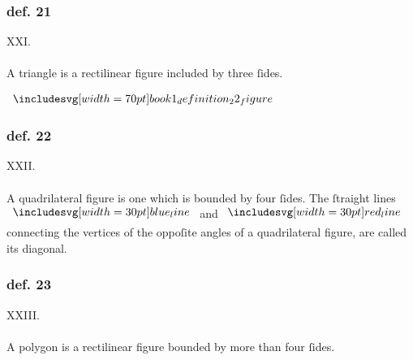 \hfill

\begin{minipage}{0.67\textwidth}
    \subsubsection{def. 21}
    \begin{center}
        XXI.\label{book1def21}\\
        \hfill\\
        A triangle is a rectilinear figure included by three ſides.\\
    \end{center}
\end{minipage}%
\begin{minipage}{0.33\textwidth}
    \phantom{}
\end{minipage}

\hfill

\begin{minipage}{0.33\textwidth}
    \begin{center}
        $\img[0][0][70]{book1_definition_22_figure}$
    \end{center}
\end{minipage}%
\begin{minipage}{0.67\textwidth}
    \subsubsection{def. 22}
    \begin{center}
        XXII.\label{book1def22}\\
        \hfill\\
        A quadrilateral figure is one which is bounded by four ſides. The ſtraight lines $\blueline$ and $\redline$ connecting the vertices of the oppoſite angles of a quadrilateral figure, are called its diagonal.
    \end{center}
\end{minipage}

\hfill

\begin{minipage}{0.33\textwidth}
    \phantom{}
\end{minipage}%
\begin{minipage}{0.67\textwidth}
    \subsubsection{def. 23}
    \begin{center}
        XXIII.\label{book1def23}\\
        \hfill\\
        A polygon is a rectilinear figure bounded by more than four ſides.\\
    \end{center}
\end{minipage}


